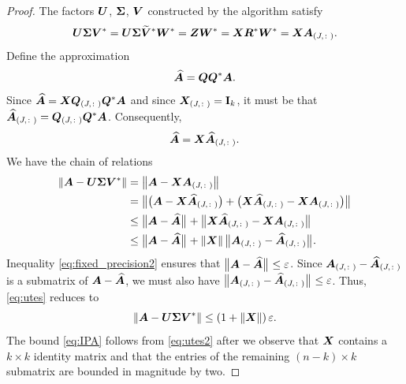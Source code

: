 \documentclass[final]{siamltex}
\newcounter{algorithm}[section]
\newcommand{\pgnotate}[1]{{\color{blue}[#1]}}
\newcommand{\notate}[1]{\textcolor{red}{\textbf{[#1]}}}
\begin{document}

\begin{proof}
The factors $\bm{U}$, $\bm{\Sigma}$, $\bm{V}$ constructed by the algorithm satisfy
$$
\bm{U\Sigma V}^{*} =
\bm{U\Sigma}\widetilde{\bm{V}}^{*}\bm{W}^{*} =
\bm{Z}\bm{W}^* =
\bm{XR}^{*}\bm{W}^{*} =
\bm{XA}_{(J,\colon)}.
$$
Define the approximation
\begin{equation}
\label{eq:desch}
\widehat{\mtx{A}} = \mtx{QQ}^{\adj}\mtx{A}.
\end{equation}
Since $\widehat{\bm{A}} = \bm{XQ}_{(J,\colon)}\bm{Q}^{*}\bm{A}$
and since $\bm{X}_{(J,\colon)} = \mathbf{I}_{k}$, it must be that
$\widehat{\bm{A}}_{(J,\colon)} = \bm{Q}_{(J,\colon)}\bm{Q}^{*}\bm{A}$.
Consequently,
$$
\widehat{\bm{A}} = \bm{X}\widehat{\bm{A}}_{(J,\colon)}.
$$
We have the chain of relations
\begin{align}
\label{eq:utes}
\norm{\mtx{A} - \mtx{U\Sigma V}^{\adj}}
    &= \norm{\mtx{A} - \mtx{XA}_{(J,\colon)}} \notag \\
    &= \smnorm{}{\big(\mtx{A} - \mtx{X}\widehat{\mtx{A}}_{(J,\colon)} \big) +
        \big(\mtx{X}\widehat{\mtx{A}}_{(J,\colon)} - \mtx{XA}_{(J,\colon)}\big)} \notag \\
    &\leq \smnorm{}{\mtx{A} -
     \widehat{\mtx{A}}} + \smnorm{}{\mtx{X}\widehat{\mtx{A}}_{(J,\colon)} - \mtx{XA}_{(J,\colon)}} \notag \\
    &\leq \smnorm{}{\mtx{A} -
     \widehat{\mtx{A}}} + \norm{\mtx{X}}\smnorm{}{ \mtx{A}_{(J,\colon)} - \widehat{\mtx{A}}_{(J,\colon)}}.
\end{align}
Inequality \eqref{eq:fixed_precision2} ensures that ${\bigl\Vert {\bm{A} -
\widehat{\bm{A}}} \bigr\Vert}_{} \leq \varepsilon$.  Since $\bm{A}_{(J,\colon)} -
\widehat{\bm{A}}_{(J,\colon)}$ is a submatrix of $\bm{A} -
\widehat{\bm{A}}$, we must also have ${\bigl\Vert {\bm{A}_{(J,\colon)} -
\widehat{\bm{A}}_{(J,\colon)}} \bigr\Vert}_{} \leq \varepsilon$.
Thus, \eqref{eq:utes} reduces to
\begin{equation}
\label{eq:utes2}
\norm{\mtx{A} - \mtx{U}\mtx{\Sigma}\mtx{V}^{\adj}} \leq \left(1 + \norm{\mtx{X}}\right) \eps.
\end{equation}
The bound \eqref{eq:IPA} follows from \eqref{eq:utes2} after we observe that
$\bm{X}$ contains a $k\times k$ identity matrix and that the entries of the
remaining $(n-k) \times k$ submatrix are bounded in magnitude by two.
\end{proof}
\end{document}
